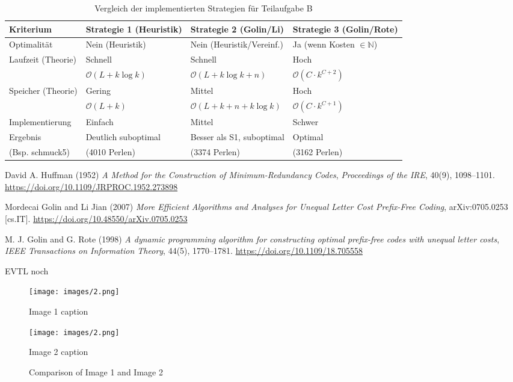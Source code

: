 \documentclass[a4paper,10pt,ngerman]{scrartcl}
\begin{document}
\begin{table}[h!]
\centering
\begin{tabular}{|l|l|l|l|}
\hline
\textbf{Kriterium} & \textbf{Strategie 1 (Heuristik)} & \textbf{Strategie 2 (Golin/Li)} & \textbf{Strategie 3 (Golin/Rote)} \\ \hline \hline
Optimalität & Nein (Heuristik) & Nein (Heuristik/Vereinf.) & Ja (wenn Kosten $\in \mathbb{N}$) \\ \hline
Laufzeit (Theorie) & Schnell & Schnell & Hoch \\
& $\mathcal{O}(L + k \log k)$ & $\mathcal{O}(L + k \log k + n)$ & $\mathcal{O}(C \cdot k^{C+2})$ \\ \hline
Speicher (Theorie) & Gering & Mittel & Hoch \\
& $\mathcal{O}(L + k)$ & $\mathcal{O}(L + k + n + k \log k)$ & $\mathcal{O}(C \cdot k^{C+1})$ \\ \hline
Implementierung & Einfach & Mittel & Schwer \\ \hline
Ergebnis & Deutlich suboptimal & Besser als S1, suboptimal & Optimal \\
(Bsp. schmuck5) & (4010 Perlen) & (3374 Perlen) & (3162 Perlen) \\ \hline
\end{tabular}
\caption{Vergleich der implementierten Strategien für Teilaufgabe B}
\label{tab:strategievergleich}
\end{table}

\begin{thebibliography}{9}
David A. Huffman (1952) \emph{A Method for the Construction of Minimum-Redundancy Codes}, 
\emph{Proceedings of the IRE}, 40(9), 1098--1101. 
\url{https://doi.org/10.1109/JRPROC.1952.273898}

Mordecai Golin and Li Jian (2007) \emph{More Efficient Algorithms and Analyses for Unequal Letter Cost Prefix-Free Coding}, 
arXiv:0705.0253 [cs.IT]. \url{https://doi.org/10.48550/arXiv.0705.0253}

M. J. Golin and G. Rote (1998) \emph{A dynamic programming algorithm for constructing optimal prefix-free codes with unequal letter costs}, 
\emph{IEEE Transactions on Information Theory}, 44(5), 1770--1781. 
\url{https://doi.org/10.1109/18.705558}


\end{thebibliography}

EVTL noch

\begin{figure}[htbp]
  \centering
  \begin{minipage}[b]{0.45\textwidth}
    \centering
    \texttt{[image: images/2.png]}
    \caption*{Image 1 caption} %
  \end{minipage}
  \hfill
  \begin{minipage}[b]{0.45\textwidth}
    \centering
    \texttt{[image: images/2.png]}
    \caption*{Image 2 caption}
  \end{minipage}
  \caption{Comparison of Image 1 and Image 2}
  \label{fig:comparison2}
\end{figure}
\end{document}
